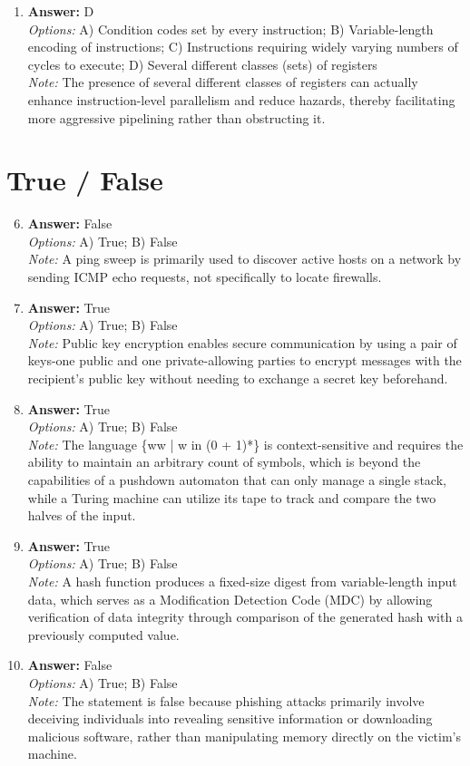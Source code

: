 \documentclass[12pt]{article}
\begin{document}
\begin{enumerate}[label=\arabic*.]
\item \textbf{Answer:} D
\\ \textit{Options:} A) Condition codes set by every instruction; B) Variable-length encoding of instructions; C) Instructions requiring widely varying numbers of cycles to execute; D) Several different classes (sets) of registers
\\ \textit{Note:} The presence of several different classes of registers can actually enhance instruction-level parallelism and reduce hazards, thereby facilitating more aggressive pipelining rather than obstructing it.
\end{enumerate}

\section*{True / False}
\begin{enumerate}[label=\arabic*.]
\setcounter{enumi}{5}
\item \textbf{Answer:} False
\\ \textit{Options:} A) True; B) False
\\ \textit{Note:} A ping sweep is primarily used to discover active hosts on a network by sending ICMP echo requests, not specifically to locate firewalls.
\item \textbf{Answer:} True
\\ \textit{Options:} A) True; B) False
\\ \textit{Note:} Public key encryption enables secure communication by using a pair of keys-one public and one private-allowing parties to encrypt messages with the recipient's public key without needing to exchange a secret key beforehand.
\item \textbf{Answer:} True
\\ \textit{Options:} A) True; B) False
\\ \textit{Note:} The language \{ww | w in (0 + 1)*\} is context-sensitive and requires the ability to maintain an arbitrary count of symbols, which is beyond the capabilities of a pushdown automaton that can only manage a single stack, while a Turing machine can utilize its tape to track and compare the two halves of the input.
\item \textbf{Answer:} True
\\ \textit{Options:} A) True; B) False
\\ \textit{Note:} A hash function produces a fixed-size digest from variable-length input data, which serves as a Modification Detection Code (MDC) by allowing verification of data integrity through comparison of the generated hash with a previously computed value.
\item \textbf{Answer:} False
\\ \textit{Options:} A) True; B) False
\\ \textit{Note:} The statement is false because phishing attacks primarily involve deceiving individuals into revealing sensitive information or downloading malicious software, rather than manipulating memory directly on the victim's machine.
\end{enumerate}
\end{document}
